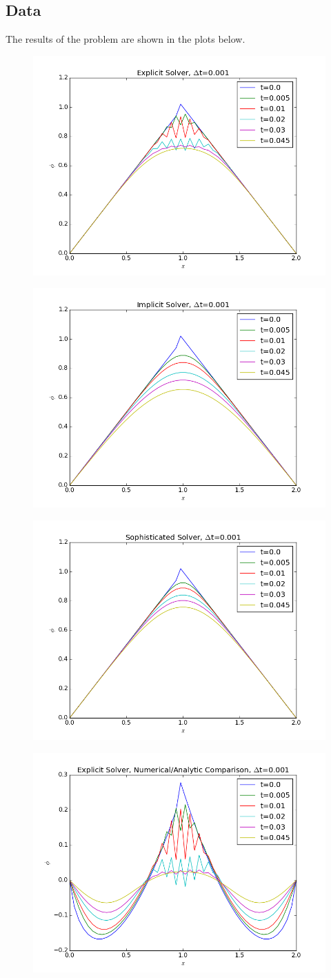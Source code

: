 \documentclass[10pt,letter]{article}
\begin{document}
\subsection{Data}
The results of the problem are shown in the plots below.
\begin{figure}[H]
  \centering
    \includegraphics[width=.6\textwidth]{homework7_problem2_plot0}
\end{figure}
\begin{figure}[H]
  \centering
    \includegraphics[width=.6\textwidth]{homework7_problem2_plot1}
\end{figure}
\begin{figure}[H]
  \centering
    \includegraphics[width=.6\textwidth]{homework7_problem2_plot2}
\end{figure}
\begin{figure}[H]
  \centering
    \includegraphics[width=.6\textwidth]{homework7_problem2_plot3}
\end{figure}
\end{document}
